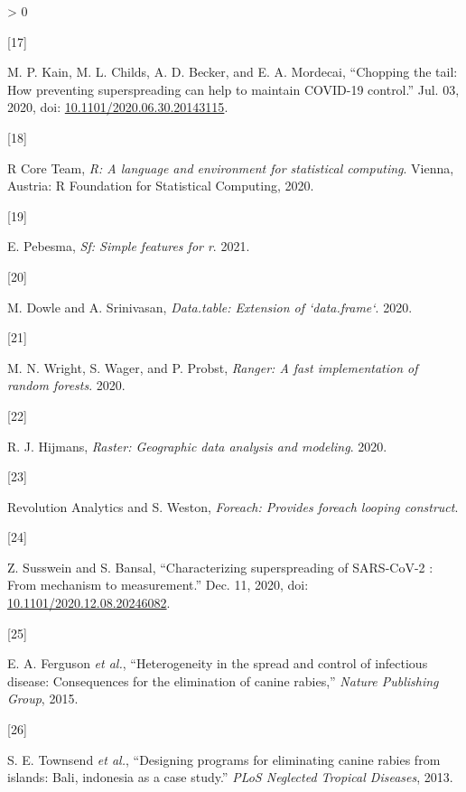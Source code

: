 \documentclass[
  oneside]{book}
\newlength{\cslhangindent}
\newlength{\csllabelwidth}
\newenvironment{CSLReferences}[2] %
 {%
  \setlength{\parindent}{0pt}
  \ifodd #1 \everypar{\setlength{\hangindent}{\cslhangindent}}\ignorespaces\fi
  \ifnum #2 > 0
  \setlength{\parskip}{#2\baselineskip}
  \fi
 }%
 {}
\newcommand{\CSLLeftMargin}[1]{\parbox[t]{\csllabelwidth}{#1}}
\newcommand{\CSLRightInline}[1]{\parbox[t]{\linewidth - \csllabelwidth}{#1}\break}
\begin{document}
\begin{CSLReferences}{0}{0}
\leavevmode\hypertarget{ref-Kain2020}{}%
\CSLLeftMargin{{[}17{]} }
\CSLRightInline{M. P. Kain, M. L. Childs, A. D. Becker, and E. A. Mordecai, {``Chopping the tail: How preventing superspreading can help to maintain COVID-19 control.''} Jul. 03, 2020, doi: \href{https://doi.org/10.1101/2020.06.30.20143115}{10.1101/2020.06.30.20143115}.}

\leavevmode\hypertarget{ref-R-program}{}%
\CSLLeftMargin{{[}18{]} }
\CSLRightInline{R Core Team, \emph{R: A language and environment for statistical computing}. Vienna, Austria: R Foundation for Statistical Computing, 2020.}

\leavevmode\hypertarget{ref-R-sf}{}%
\CSLLeftMargin{{[}19{]} }
\CSLRightInline{E. Pebesma, \emph{Sf: Simple features for r}. 2021.}

\leavevmode\hypertarget{ref-R-data.table}{}%
\CSLLeftMargin{{[}20{]} }
\CSLRightInline{M. Dowle and A. Srinivasan, \emph{Data.table: Extension of `data.frame`}. 2020.}

\leavevmode\hypertarget{ref-R-ranger}{}%
\CSLLeftMargin{{[}21{]} }
\CSLRightInline{M. N. Wright, S. Wager, and P. Probst, \emph{Ranger: A fast implementation of random forests}. 2020.}

\leavevmode\hypertarget{ref-R-raster}{}%
\CSLLeftMargin{{[}22{]} }
\CSLRightInline{R. J. Hijmans, \emph{Raster: Geographic data analysis and modeling}. 2020.}

\leavevmode\hypertarget{ref-R-foreach}{}%
\CSLLeftMargin{{[}23{]} }
\CSLRightInline{Revolution Analytics and S. Weston, \emph{Foreach: Provides foreach looping construct}.}

\leavevmode\hypertarget{ref-susswein2020}{}%
\CSLLeftMargin{{[}24{]} }
\CSLRightInline{Z. Susswein and S. Bansal, {``Characterizing superspreading of SARS-CoV-2 : From mechanism to measurement.''} Dec. 11, 2020, doi: \href{https://doi.org/10.1101/2020.12.08.20246082}{10.1101/2020.12.08.20246082}.}

\leavevmode\hypertarget{ref-ferguson2015}{}%
\CSLLeftMargin{{[}25{]} }
\CSLRightInline{E. A. Ferguson \emph{et al.}, {``Heterogeneity in the spread and control of infectious disease: Consequences for the elimination of canine rabies,''} \emph{Nature Publishing Group}, 2015.}

\leavevmode\hypertarget{ref-townsend2013}{}%
\CSLLeftMargin{{[}26{]} }
\CSLRightInline{S. E. Townsend \emph{et al.}, {``Designing programs for eliminating canine rabies from islands: Bali, indonesia as a case study.''} \emph{PLoS Neglected Tropical Diseases}, 2013.}


\end{CSLReferences}
\end{document}
